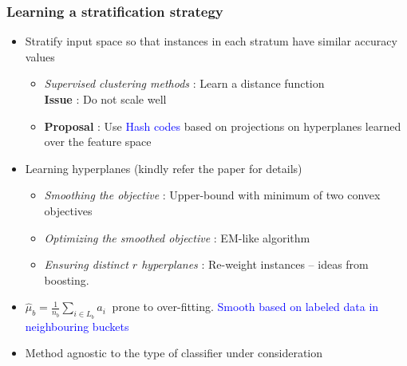 \documentclass[11pt]{beamer}
\newcommand{\acc}{{a}}
\newcommand{\estSb}{{\mbox{$\hat{\mu}$}}}
\newlength{\wideitemsep}
\let\olditem\item
\renewcommand{\item}{\setlength{\itemsep}{\wideitemsep}\olditem}
\begin{document}
\begin{frame}
\frametitle{Learning a stratification strategy} %
\begin{itemize}
\pause
\item Stratify input space so that instances in each stratum have similar accuracy values
\pause
\begin{itemize}
\item \emph{Supervised clustering methods} : Learn a distance function \\ \textbf{Issue} : Do not scale well 
\item \textbf{Proposal} : Use \textcolor{blue}{Hash codes} based on projections on hyperplanes learned over the feature space
\end{itemize}
\pause
\item Learning hyperplanes (kindly refer the paper for details)
\begin{itemize}
\item \emph{Smoothing the objective} : Upper-bound with minimum of two convex objectives
\item \emph{Optimizing the smoothed objective} : EM-like algorithm
\item \emph{Ensuring distinct $r$ hyperplanes} : Re-weight instances -- ideas from boosting. 
\end{itemize}
\pause
\item $\estSb_b=\frac{1}{n_b}\sum_{i\in L_b}\acc_i~$ prone to over-fitting. \textcolor{blue}{Smooth based on labeled data in neighbouring buckets}
\pause
\item Method agnostic to the type of classifier under consideration
\end{itemize}
\end{frame}
\end{document}
